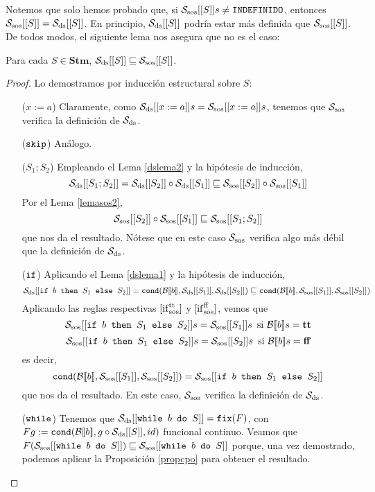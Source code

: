 Notemos que solo hemos probado que, si $\mathcal{S}_{\mathrm{sos}}[[S]]s \neq \texttt{INDEFINIDO}$, entonces $\mathcal{S}_{\mathrm{sos}}[[S]]=\mathcal{S}_{\mathrm{ds}}[[S]]$. En principio, $\mathcal{S}_{\mathrm{ds}}[[S]]$ podría estar más definida que $\mathcal{S}_{\mathrm{sos}}[[S]]$. De todos modos, el siguiente lema nos asegura que no es el caso:

\begin{lema}
Para cada $S \in \mathbf{Stm}$, $\mathcal{S}_{\mathrm{ds}}[[S]]\sqsubseteq \mathcal{S}_{\mathrm{sos}}[[S]]$.
\end{lema}
\begin{proof}
Lo demostramos por inducción estructural sobre $S$:
\begin{itemize}
    \item[($x:=a$)] Claramente, como $\mathcal{S}_{\mathrm{ds}}[[x:=a]]s = \mathcal{S}_{\mathrm{sos}}[[x:=a]]s$, tenemos que $\mathcal{S}_{\mathrm{sos}}$ verifica la definición de $\mathcal{S}_{\mathrm{ds}}$.
    \item[($\texttt{skip}$)] Análogo. 
    \item[($S_1;S_2$)] Empleando el Lema \ref{dslema2} y la hipótesis de inducción,
    $$\mathcal{S}_{\mathrm{ds}}[[S_1;S_2]] = \mathcal{S}_{\mathrm{ds}}[[S_2]] \circ \mathcal{S}_{\mathrm{ds}}[[S_1]] \sqsubseteq \mathcal{S}_{\mathrm{sos}}[[S_2]] \circ \mathcal{S}_{\mathrm{sos}}[[S_1]]$$
Por el Lema \ref{lemasos2},
$$\mathcal{S}_{\mathrm{sos}}[[S_2]] \circ \mathcal{S}_{\mathrm{sos}}[[S_1]] \sqsubseteq \mathcal{S}_{\mathrm{sos}}[[S_1;S_2]]$$
que nos da el resultado. Nótese que en este caso $\mathcal{S}_{\mathrm{sos}}$ verifica algo más débil que la definición de $\mathcal{S}_{\mathrm{ds}}$.
    \item[($\texttt{if}$)] Aplicando el Lema \ref{dslema1} y la hipótesis de inducción,
    $$\mathcal{S}_{\mathrm{ds}}[[\texttt{if }b\texttt{ then }S_1\texttt{ else }S_2]] = \texttt{cond}(\mathcal{B}[\![b]\!], \mathcal{S}_{\mathrm{ds}}[[S_1]], \mathcal{S}_{\mathrm{ds}}[[S_2]]) \sqsubseteq \texttt{cond}(\mathcal{B}[\![b]\!], \mathcal{S}_{\mathrm{sos}}[[S_1]], \mathcal{S}_{\mathrm{sos}}[[S_2]])$$
Aplicando las reglas respectivas $[\mathrm{if}_{\mathrm{sos}}^{\mathrm{tt}}]$ y $[\mathrm{if}_{\mathrm{sos}}^{\mathrm{ff}}]$, vemos que
$$\mathcal{S}_{\mathrm{sos}}[[\texttt{if }b\texttt{ then }S_1\texttt{ else }S_2]]s = \mathcal{S}_{\mathrm{sos}}[[S_1]]s \, \text{ si } \mathcal{B}[\![b]\!]s = \mathbf{tt}$$
$$\mathcal{S}_{\mathrm{sos}}[[\texttt{if }b\texttt{ then }S_1\texttt{ else }S_2]]s =  \mathcal{S}_{\mathrm{sos}}[[S_2]]s \, \text{ si } \mathcal{B}[\![b]\!]s =\mathbf{ff}$$
es decir, 
$$\texttt{cond}(\mathcal{B}[\![b]\!], \mathcal{S}_{\mathrm{sos}}[[S_1]], \mathcal{S}_{\mathrm{sos}}[[S_2]]) = \mathcal{S}_{\mathrm{sos}}[[\texttt{if }b\texttt{ then }S_1\texttt{ else }S_2]]$$
que nos da el resultado. En este caso, $\mathcal{S}_{\mathrm{sos}}$ verifica la definición de $\mathcal{S}_{\mathrm{ds}}$.
    \item[($\texttt{while}$)] Tenemos que $\mathcal{S}_{\mathrm{ds}}[[\texttt{while }b\texttt{ do }S]] = \texttt{fix}(F)$, con $Fg := \texttt{cond}(\mathcal{B}[\![b]\!], g\circ \mathcal{S}_{\mathrm{ds}}[[S]], id)$ funcional continuo. Veamos que $F(\mathcal{S}_{\mathrm{sos}}[[\texttt{while }b\texttt{ do }S]]) \sqsubseteq \mathcal{S}_{\mathrm{sos}}[[\texttt{while }b\texttt{ do }S]]$ porque, una vez demostrado, podemos aplicar la Proposición \ref{propcpo} para obtener el resultado. 
    

\end{itemize}
\end{proof}
